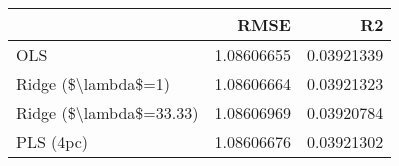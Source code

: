 \begin{tabular}{lrr}
\toprule
{} &        RMSE &          R2 \\
\midrule
OLS                     &  1.08606655 &  0.03921339 \\
Ridge (\$\textbackslash lambda\$=1)     &  1.08606664 &  0.03921323 \\
Ridge (\$\textbackslash lambda\$=33.33) &  1.08606969 &  0.03920784 \\
PLS (4pc)               &  1.08606676 &  0.03921302 \\
\bottomrule
\end{tabular}
